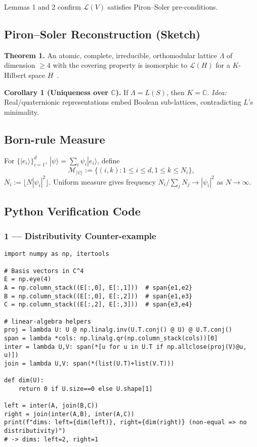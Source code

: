 \documentclass[aps,prx,twocolumn]{revtex4-2}
\begin{document}
\begin{widetext}
\begin{appendix}
Lemmas 1 and 2 confirm $\mathcal{L}(V)$ satisfies Piron--Soler pre-conditions.

\subsection*{Piron--Soler Reconstruction (Sketch)}
\textbf{Theorem 1.} An atomic, complete, irreducible, orthomodular lattice $\Lambda$ of dimension $\ge 4$ with the covering property is isomorphic to $\mathcal{L}(H)$ for a $K$-Hilbert space $H$~\cite{piron1976,soler1995}.

\textbf{Corollary 1 (Uniqueness over $\mathbb{C}$).} If $\Lambda = L(S)$, then $K = \mathbb{C}$. \emph{Idea:} Real/quaternionic representations embed Boolean sub-lattices, contradicting $L$’s minimality.

\subsection*{Born-rule Measure}
For $\{|e_i\rangle\}_{i=1}^d$, $|\psi\rangle = \sum_i \psi_i |e_i\rangle$, define
\[
\mathcal{M}_{|\psi\rangle} := \{(i,k): 1 \le i \le d, 1 \le k \le N_i\},
\]
$N_i := \lfloor N |\psi_i|^2 \rfloor$. Uniform measure gives frequency $N_i / \sum_j N_j \to |\psi_i|^2$ as $N \to \infty$.

\subsection*{Python Verification Code}
\subsubsection*{1 --- Distributivity Counter-example}
\begin{verbatim}
import numpy as np, itertools

# Basis vectors in C^4
E = np.eye(4)
A = np.column_stack((E[:,0], E[:,1]))  # span{e1,e2}
B = np.column_stack((E[:,0], E[:,2]))  # span{e1,e3}
C = np.column_stack((E[:,2], E[:,3]))  # span{e3,e4}

# linear-algebra helpers
proj = lambda U: U @ np.linalg.inv(U.T.conj() @ U) @ U.T.conj()
span = lambda *cols: np.linalg.qr(np.column_stack(cols))[0]
inter = lambda U,V: span(*[u for u in U.T if np.allclose(proj(V)@u, u)])
join = lambda U,V: span(*(list(U.T)+list(V.T)))

def dim(U):
    return 0 if U.size==0 else U.shape[1]

left = inter(A, join(B,C))
right = join(inter(A,B), inter(A,C))
print(f"dims: left={dim(left)}, right={dim(right)} (non-equal => no distributivity)")
# -> dims: left=2, right=1
\end{verbatim}


\end{appendix}
\end{widetext}
\end{document}
